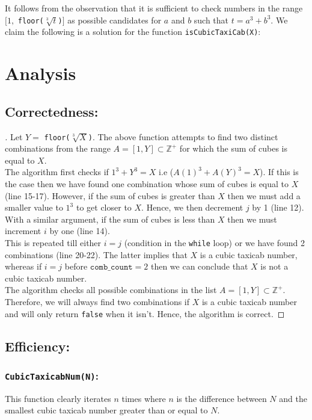 \documentclass[12pt]{report}
\begin{document}
It follows from the observation that it is sufficient to check numbers in the range $[1,$ \texttt{floor($\sqrt[3]{t}$)}$]$ as possible candidates for $a$ and $b$ such that $t=a^3+b^3$. We claim the following is a solution for the function \texttt{isCubicTaxiCab(X)}: \\



\section{Analysis}
\subsection{Correctedness:}
\begin{proof}[\unskip\nopunct]
Let $Y=$ \texttt{floor($\sqrt[3]{X}$)}. The above function attempts to find two distinct combinations from the range $A=[1,Y]\subset \mathbb{Z^+}$ for which the sum of cubes is equal to $X$. \\ 

The algorithm first checks if $1^3+Y^3=X$ i.e ($A(1)^3+A(Y)^3 = X$). If this is the case then we have found one combination whose sum of cubes is equal to $X$ (line 15-17). However, if the sum of cubes is greater than $X$ then we must add a smaller value to $1^3$ to get closer to $X$. Hence, we then decrement $j$ by 1 (line 12). With a similar argument, if the sum of cubes is less than $X$ then we must increment $i$ by one (line 14). \\

This is repeated till either $i=j$ (condition in the \texttt{while} loop) or we have found 2 combinations (line 20-22). The latter implies that $X$ is a cubic taxicab number, whereas if $i=j$ before $\texttt{comb\_count}=2$ then we can conclude that $X$ is not a cubic taxicab number. \\

The algorithm checks all possible combinations in the list $A = [1,Y] \subset \mathbb{Z^+}$. Therefore, we will always find two combinations if $X$ is a cubic taxicab number and will only return \texttt{false} when it isn't. Hence, the algorithm is correct.
\end{proof}

\subsection{Efficiency:}
\subsubsection{\texttt{CubicTaxicabNum(N)}:}
This function clearly iterates $n$ times where $n$ is the difference between $N$ and the smallest cubic taxicab number greater than or equal to $N$.
\end{document}
